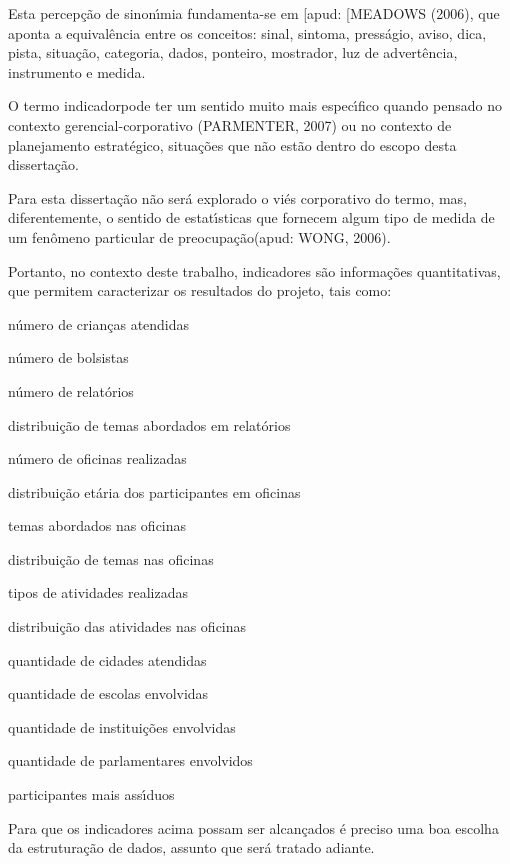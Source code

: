 \documentclass[
12pt,		%
openright,	%
twoside,  %
a4paper,			%
chapter=TITLE,		%
english,			%
french,				%
spanish,			%
brazil				%
]{USPSC-classe/USPSC}
\begin{document}
Esta percep\c{c}\~ao de sinon\'{\i}mia fundamenta-se em [apud: [MEADOWS (2006), que aponta a equival\^encia entre os conceitos: sinal, sintoma, press\'agio, aviso, dica, pista, situa\c{c}\~ao, categoria, dados, ponteiro, mostrador, luz de advert\^encia, instrumento e medida.


O termo \textquotedbl indicador\textquotedbl  pode ter um sentido muito mais espec\'{\i}fico quando pensado no contexto gerencial-corporativo (PARMENTER, 2007) ou no contexto de planejamento estrat\'egico, situa\c{c}\~oes que n\~ao est\~ao dentro do escopo desta disserta\c{c}\~ao.


Para esta disserta\c{c}\~ao n\~ao ser\'a explorado o vi\'es corporativo do termo, mas, diferentemente, o sentido de \textquotedbl estat\'{\i}sticas que fornecem algum tipo de medida de um fen\^omeno particular de preocupa\c{c}\~ao\textquotedbl  (apud: WONG, 2006).


Portanto, no contexto deste trabalho, indicadores s\~ao informa\c{c}\~oes quantitativas, que permitem caracterizar os resultados do projeto, tais como:



\begin{alineas}
\item n\'umero de crian\c{c}as atendidas
\item n\'umero de bolsistas
\item n\'umero de relat\'orios
\item distribui\c{c}\~ao de temas abordados em relat\'orios
\item n\'umero de oficinas realizadas
\item distribui\c{c}\~ao et\'aria dos participantes em oficinas
\item temas abordados nas oficinas
\item distribui\c{c}\~ao de temas nas oficinas
\item tipos de atividades realizadas
\item distribui\c{c}\~ao das atividades nas oficinas
\item quantidade de cidades atendidas
\item quantidade de escolas envolvidas
\item quantidade de institui\c{c}\~oes envolvidas
\item quantidade de parlamentares envolvidos
\item participantes mais ass\'{\i}duos
\end{alineas}

Para que os indicadores acima possam ser alcan\c{c}ados \'e preciso uma boa escolha da estrutura\c{c}\~ao de dados, assunto que ser\'a tratado adiante.
\end{document}
